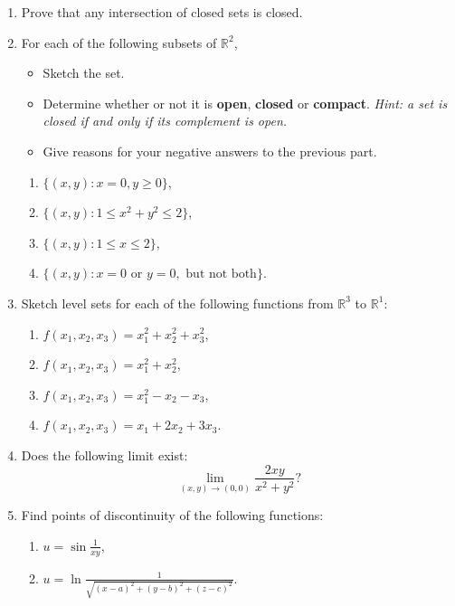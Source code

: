 \documentclass[12pt]{article} %
\theoremstyle{definition} %
\newcommand{\R}{\mathbb{R}}
\begin{document}
\begin{enumerate}

\item Prove that any intersection of closed sets is closed.

\item For each of the following subsets of $\R^2$,
\begin{itemize}
\item Sketch the set.
\item Determine whether or not it is \textbf{open}, \textbf{closed} or \textbf{compact}. 
\textit{Hint: a set is closed if and only if its complement is open.}
\item Give  reasons for your negative answers to the previous part.
\end{itemize}

\begin{enumerate}
\item $\{(x, y)\colon x=0, y\geq 0\}$,
\item $\{(x,y)\colon 1\leq x^2+y^2\leq 2\}$,
\item $\{(x,y)\colon 1\leq x\leq 2\}$,
\item $\{(x,y)\colon x=0 \text{ or } y=0, \text{ but not both}\}$.
\end{enumerate}

\item Sketch level sets for each of the following functions from $\R^3$ to $\R^1$:

\begin{enumerate}
\item $f(x_1, x_2, x_3)=x_1^2+x_2^2+x_3^2$,
\item $f(x_1, x_2, x_3)=x_1^2+x_2^2$,
\item $f(x_1, x_2, x_3)=x_1^2-x_2-x_3$,
\item $f(x_1, x_2, x_3)=x_1+2x_2+3x_3$.
\end{enumerate}

\item Does the following limit exist: 
\[
	\lim_{(x,y)\to (0,0)}\frac{2xy}{x^2+y^2}?
\]

\item Find points of discontinuity of the following functions:
\begin{enumerate}
\item $u=\sin\frac 1{xy}$,
\item $u=\ln\frac 1{\sqrt{(x-a)^2+(y-b)^2+(z-c)^2}}$.
\end{enumerate}

\end{enumerate}
\end{document}
